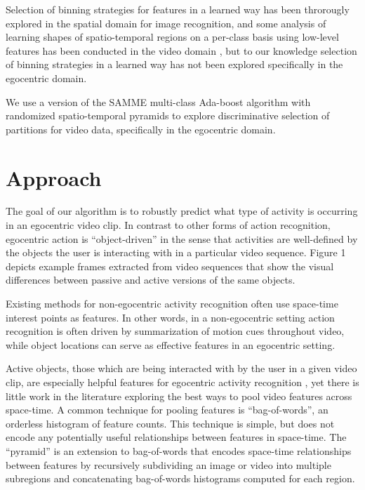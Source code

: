 \documentclass{bmvc2k}
\begin{document}
  Selection of binning strategies for features in a learned way has been throrougly explored in the
  spatial domain \cite{Sharma11, Jiang12} for image recognition, and some
  analysis of learning shapes of spatio-temporal regions on a per-class
  basis using low-level features has been conducted in the video domain \cite{Kovashka10}, but to
  our knowledge selection of binning strategies in a learned way has not
  been explored specifically in the egocentric domain.
  
	
  
	We use a version of the SAMME multi-class Ada-boost algorithm \cite{Zhu06}
  with randomized spatio-temporal pyramids to explore discriminative
  selection of partitions for video data, specifically in the egocentric
  domain.

\section{Approach}
  The goal of our algorithm is to robustly predict what type of activity is occurring in
  an egocentric video clip. In contrast to other forms of action
  recognition, egocentric action is ``object-driven'' in the sense that
  activities are well-defined by the objects the user is interacting with in
  a particular video sequence. Figure 1 depicts example frames extracted from
  video sequences that show the visual differences between passive and
  active versions of the same objects.
  
  Existing methods for non-egocentric activity
  recognition often use space-time interest points \cite{Laptev03} as features. In other
  words, in a non-egocentric setting action recognition is often driven by
  summarization of motion cues throughout video, while object locations can
  serve as effective features in an egocentric setting.

  Active objects, those which are being interacted with by the user in a
  given video clip, are especially helpful features for egocentric activity
  recognition \cite{Ramanan12}, yet there is little work in the literature
  exploring the best ways to pool video features across space-time. A common
  technique for pooling features is ``bag-of-words'', an orderless histogram
  of feature counts. This technique is simple, but does not encode any
  potentially useful relationships between features in space-time. The
  ``pyramid'' is an extension to bag-of-words that encodes space-time
  relationships between features by recursively
  subdividing an image or video into multiple subregions and concatenating
  bag-of-words histograms computed for each region. 
\end{document}
